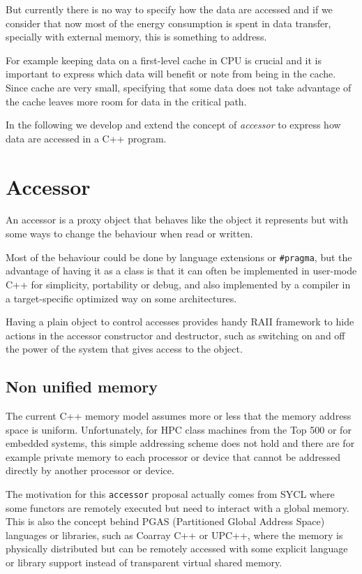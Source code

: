 \documentclass{article}
\begin{document}
But currently there is no way to specify how the data are accessed and
if we consider that now most of the energy consumption is spent in
data transfer, specially with external memory, this is something to
address.

For example keeping data on a first-level cache in CPU is crucial and
it is important to express which data will benefit or note from being
in the cache. Since cache are very small, specifying that some data
does not take advantage of the cache leaves more room for data in the
critical path.

In the following we develop and extend the concept of \emph{accessor}
to express how data are accessed in a C++ program.


\section{Accessor}
\label{sec:accessor}

An accessor is a proxy object that behaves like the object it
represents but with some ways to change the behaviour when read or
written.

Most of the behaviour could be done by language extensions or
\lstinline|#pragma|, but the advantage of having it as a class is that
it can often be implemented in user-mode C++ for simplicity,
portability or debug, and also implemented by a compiler in a
target-specific optimized way on some architectures.

Having a plain object to control accesses provides handy RAII
framework to hide actions in the accessor constructor and destructor,
such as switching on and off the power of the system that gives access
to the object.


\subsection{Non unified memory}
\label{sec:non-unified-memory}

The current C++ memory model assumes more or less that the memory
address space is uniform. Unfortunately, for HPC class machines from
the Top 500 or for embedded systems, this simple addressing scheme
does not hold and there are for example private memory to each
processor or device that cannot be addressed directly by another
processor or device.

The motivation for this \lstinline|accessor| proposal actually comes
from SYCL where some functors are remotely executed but need to
interact with a global memory. This is also the concept behind PGAS
(Partitioned Global Address Space) languages or libraries, such as
Coarray C++ or UPC++, where the memory is physically distributed but
can be remotely accessed with some explicit language or library
support instead of transparent virtual shared memory.
\end{document}
